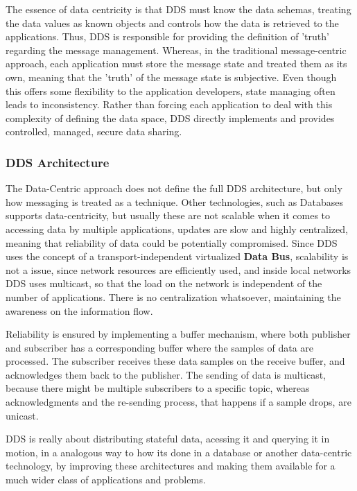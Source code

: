 The essence of data centricity is that DDS must know the data schemas, treating the data values as known objects and controls how the data is retrieved to the applications. Thus, DDS is responsible for providing the definition of 'truth' regarding the message management.  Whereas, in the traditional message-centric approach, each application must store the message state and treated them as its own, meaning that the 'truth' of the message state is subjective. Even though this offers some flexibility to the application developers, state managing often leads to inconsistency. Rather than forcing each application to deal with this complexity of defining the data space, DDS directly implements and provides controlled, managed, secure data sharing.

\subsubsection{DDS Architecture}

The Data-Centric approach does not define the full DDS architecture, but only how messaging is treated as a technique. Other technologies, such as Databases supports data-centricity, but usually these are not scalable when it comes to accessing data by multiple applications, updates are slow and highly centralized, meaning that reliability of data could be potentially compromised. Since DDS uses the concept of a transport-independent virtualized \textbf{Data Bus}, scalability is not a issue, since network resources are efficiently used, and inside local networks DDS uses multicast, so that the load on the network is independent of the number of applications. There is no centralization whatsoever, maintaining the awareness on the information flow. 
                
Reliability is ensured by implementing a buffer mechanism, where both publisher and subscriber has a corresponding buffer where the samples of data are processed. The subscriber receives these data samples on the receive buffer, and acknowledges them back to the publisher. The sending of data is multicast, because there might be multiple subscribers to a specific topic, whereas acknowledgments and the re-sending process, that happens if a sample drops, are unicast. 
                
DDS is really about distributing stateful data, acessing it and querying it in motion, in a analogous way to how its done in a database or another data-centric technology, by improving these architectures and making them available for a much wider class of applications and problems.  
                
